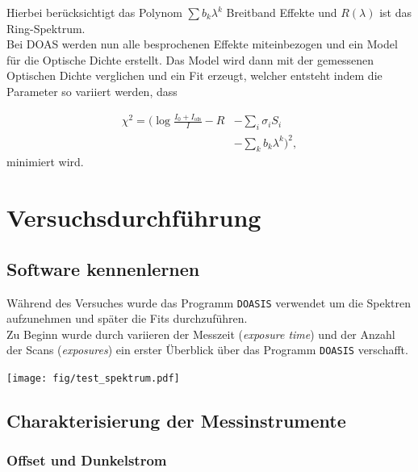 \documentclass[12pt, a4paper, bibliography=totoc]{scrartcl}
\begin{document}
\begin{multicols}{2}
Hierbei berücksichtigt das Polynom $\sum b_k \lambda^k$ Breitband Effekte und $R(\lambda)$ ist das Ring-Spektrum.\\
Bei DOAS werden nun alle besprochenen Effekte miteinbezogen und ein Model für die Optische Dichte erstellt. 
Das Model wird dann mit der gemessenen Optischen Dichte verglichen und ein Fit erzeugt, welcher entsteht indem die Parameter so variiert werden, dass 

\begin{align*}
    \chi^2 = ( \log \frac{I_0 + I_\text{ofs}}{I} - R & - \sum_i \sigma_i S_i \\ 
    & - \sum_k b_k \lambda^k )^2 ,
\end{align*}
minimiert wird.

\section{Versuchsdurchführung}\label{sec:versuchsdurchführung}

\subsection{Software kennenlernen}\label{get_to_know_the_software}

Während des Versuches wurde das Programm \verb*+DOASIS+ verwendet um die Spektren aufzunehmen und später die Fits durchzuführen.\\
Zu Beginn wurde durch variieren der Messzeit (\textit{exposure time}) und der Anzahl der Scans (\textit{exposures}) ein erster Überblick über das Programm \verb*+DOASIS+ verschafft.

\begin{center}
	\texttt{[image: fig/test\_spektrum.pdf]}
	\label{fig:test_spectrum}

\end{center}

\subsection{Charakterisierung der Messinstrumente}\label{ssec:characteristic_of_the_instruments}

\subsubsection{Offset und Dunkelstrom}\label{sssec:O&D}


\end{multicols}
\end{document}
